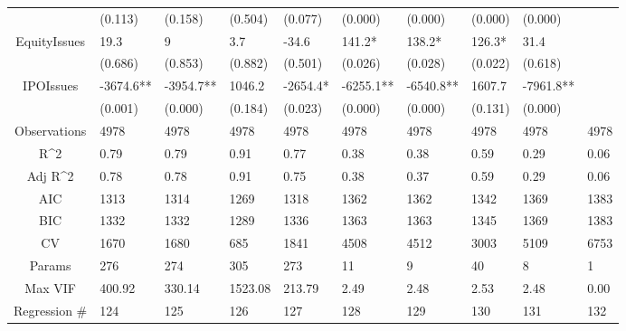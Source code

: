 \documentclass{article}
\begin{document}
\begin{table}[H]
\begin{tabular}{|clllllllll|}
   & (0.113) & (0.158) & (0.504) & (0.077) & (0.000) & (0.000) & (0.000) & (0.000) &  \\ 
  EquityIssues & 19.3 & 9 & 3.7 & -34.6 & 141.2* & 138.2* & 126.3* & 31.4 &  \\ 
   & (0.686) & (0.853) & (0.882) & (0.501) & (0.026) & (0.028) & (0.022) & (0.618) &  \\ 
  IPOIssues & -3674.6** & -3954.7** & 1046.2 & -2654.4* & -6255.1** & -6540.8** & 1607.7 & -7961.8** &  \\ 
   & (0.001) & (0.000) & (0.184) & (0.023) & (0.000) & (0.000) & (0.131) & (0.000) &  \\ 
  \hline 
 Observations & 4978 & 4978 & 4978 & 4978 & 4978 & 4978 & 4978 & 4978 & 4978 \\ 
  R^2 & 0.79 & 0.79 & 0.91 & 0.77 & 0.38 & 0.38 & 0.59 & 0.29 & 0.06 \\ 
  Adj R^2 & 0.78 & 0.78 & 0.91 & 0.75 & 0.38 & 0.37 & 0.59 & 0.29 & 0.06 \\ 
  AIC & 1313 & 1314 & 1269 & 1318 & 1362 & 1362 & 1342 & 1369 & 1383 \\ 
  BIC & 1332 & 1332 & 1289 & 1336 & 1363 & 1363 & 1345 & 1369 & 1383 \\ 
  CV & 1670 & 1680 & 685 & 1841 & 4508 & 4512 & 3003 & 5109 & 6753 \\ 
  Params & 276 & 274 & 305 & 273 & 11 & 9 & 40 & 8 & 1 \\ 
  Max VIF & 400.92 & 330.14 & 1523.08 & 213.79 & 2.49 & 2.48 & 2.53 & 2.48 & 0.00 \\ 
  Regression \# & 124 & 125 & 126 & 127 & 128 & 129 & 130 & 131 & 132 \\ 
   \hline
\end{tabular}
 
\end{table}
\end{document}
